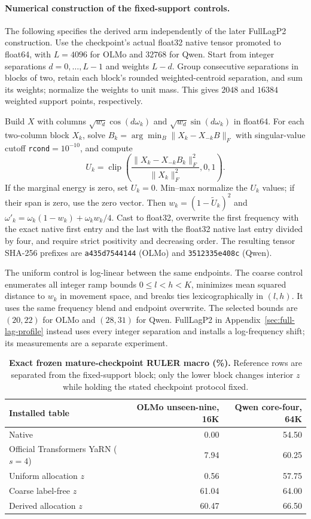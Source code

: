 \paragraph{Numerical construction of the fixed-support controls.}
The following specifies the derived arm independently of the later FullLagP2 construction. Use the checkpoint's actual float32 native tensor promoted to float64, with $L=4096$ for OLMo and $32768$ for Qwen. Start from integer separations $d=0,\ldots,L-1$ and weights $L-d$. Group consecutive separations in blocks of two, retain each block's rounded weighted-centroid separation, and sum its weights; normalize the weights to unit mass. This gives $2048$ and $16384$ weighted support points, respectively.

Build $X$ with columns $\sqrt{w_d}\cos(d\omega_k)$ and $\sqrt{w_d}\sin(d\omega_k)$ in float64. For each two-column block $X_k$, solve $B_k=\arg\min_B\|X_k-X_{-k}B\|_F$ with singular-value cutoff \texttt{rcond}$=10^{-10}$, and compute
\[
U_k=\operatorname{clip}\!\left(\frac{\|X_k-X_{-k}B_k\|_F^2}{\|X_k\|_F^2},0,1\right).
\]
If the marginal energy is zero, set $U_k=0$. Min--max normalize the $U_k$ values; if their span is zero, use the zero vector. Then $w_k=(1-\widetilde U_k)^2$ and $\omega'_k=\omega_k(1-w_k)+\omega_kw_k/4$. Cast to float32, overwrite the first frequency with the exact native first entry and the last with the float32 native last entry divided by four, and require strict positivity and decreasing order. The resulting tensor SHA-256 prefixes are \texttt{a435d7544144} (OLMo) and \texttt{3512335e408c} (Qwen).

The uniform control is log-linear between the same endpoints. The coarse control enumerates all integer ramp bounds $0\le l<h<K$, minimizes mean squared distance to $w_k$ in movement space, and breaks ties lexicographically in $(l,h)$. It uses the same frequency blend and endpoint overwrite. The selected bounds are $(20,22)$ for OLMo and $(28,31)$ for Qwen. FullLagP2 in Appendix~\ref{sec:full-lag-profile} instead uses every integer separation and installs a log-frequency shift; its measurements are a separate experiment.

\begin{table}[ht]
\centering
\small
\setlength{\tabcolsep}{5pt}
\caption{\textbf{Exact frozen mature-checkpoint RULER macro (\%).} Reference rows are
separated from the fixed-support block; only the lower block changes interior
$z$ while holding the stated checkpoint protocol fixed.}
\label{tab:frozen-fixed-support}\label{tab:frozen-exponent-main}
\begin{tabular}{@{}lrr@{}}
\toprule
Installed table & OLMo unseen-nine, 16K & Qwen core-four, 64K \\
\midrule
Native & 0.00 & 54.50 \\
Official Transformers YaRN ($s{=}4$) & 7.94 & 60.25 \\
\midrule
Uniform allocation $z$ & 0.56 & 57.75 \\
Coarse label-free $z$ & 61.04 & 64.00 \\
Derived allocation $z$ & 60.47 & 66.50 \\
\bottomrule
\end{tabular}
\end{table}

